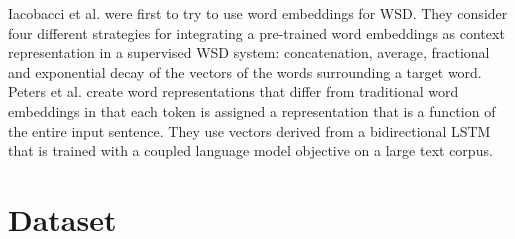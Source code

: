\documentclass{llncs}
\begin{document}
Iacobacci et al.\cite{embeddingsforWSD} were first to try to use word embeddings for WSD. They consider four different strategies for integrating a pre-trained word embeddings as context representation in a supervised WSD system: concatenation, average, fractional and exponential decay of the vectors of the words surrounding a target word.
Peters et al.\cite{deepcontext} create word representations that differ from traditional word embeddings in that each token is assigned a representation that is a function of the entire input sentence. They use vectors derived from a bidirectional LSTM that is trained with a coupled language model objective on a large text corpus.




\section{Dataset}
\label{sec:dataset}
\end{document}
